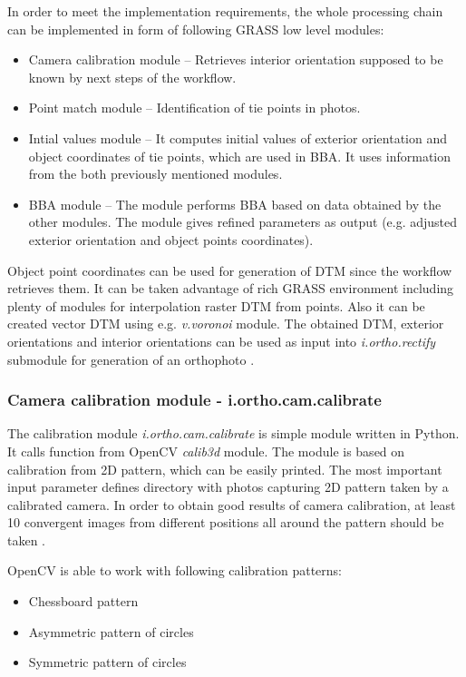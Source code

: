 \documentclass[a4paper,12pt]{article}
\newcommand{\term}[1]{%
{\it #1}%
}
\begin{document}
In order to meet the implementation requirements, the whole processing chain can be implemented in form
of following GRASS low level modules:

\begin{itemize}
\item Camera calibration module -- Retrieves interior orientation supposed to be known by 
next steps of the workflow.
\item Point match module -- Identification of tie points in photos.
\item Intial values module -- It computes initial values of exterior orientation and 
object coordinates of tie points, which are used in BBA. It uses information from the both
previously mentioned modules.
\item BBA module -- The module performs BBA based on data obtained by the other modules.
The module gives refined parameters as output (e.g. adjusted exterior orientation and object points coordinates).   
\end{itemize}

Object point coordinates can be used for generation of DTM since the workflow retrieves them. 
It can be taken advantage of rich GRASS  environment
including plenty of modules for interpolation raster DTM from points. Also it can be 
created vector DTM using e.g. \term{v.voronoi} module. 
The obtained DTM, exterior orientations and interior orientations
can be used as input into \term{i.ortho.rectify} submodule for generation of an orthophoto . 

\subsubsection{Camera calibration module - i.ortho.cam.calibrate}

The calibration module \term{i.ortho.cam.calibrate} is simple module written in Python. It calls
function from OpenCV \term{calib3d} module. The module is based on cali\-bration from 2D pattern, which can be easily printed. 
The most important input parameter defines directory with photos capturing 2D pattern 
taken by a calibrated camera. In order to obtain good results of camera calibration, at least 10 convergent images 
from different positions all around the pattern should be taken \cite{camera_calibration2013opencv}.

OpenCV is able to work with following calibration patterns:
\begin{itemize}
\item Chessboard pattern 
\item Asymmetric pattern of circles
\item Symmetric pattern of circles
\end{itemize}
\end{document}

